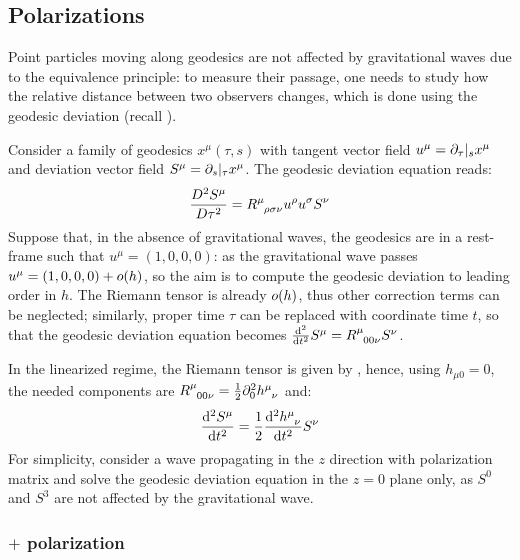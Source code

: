 \subsection{Polarizations}

Point particles moving along geodesics are not affected by gravitational waves due to the equivalence principle: to measure their passage, one needs to study how the relative distance between two observers changes, which is done using the geodesic deviation (recall ).

Consider a family of geodesics $ x^\mu(\tau,s) $ with tangent vector field $ u^\mu = \partial_\tau \vert_s x^\mu $ and deviation vector field $ S^\mu = \partial_s \vert_\tau x^\mu $. The geodesic deviation equation  reads:
\begin{equation*}
  \frac{D^2 S^\mu}{D \tau^2} = \tensor{R}{^\mu_{\rho \sigma \nu}} u^\rho u^\sigma S^\nu
\end{equation*}
Suppose that, in the absence of gravitational waves, the geodesics are in a rest-frame such that $ u^\mu = (1,0,0,0) $: as the gravitational wave passes $ u^\mu = (1,0,0,0) + o(h) $, so the aim is to compute the geodesic deviation to leading order in $ h $. The Riemann tensor is already $ o(h) $, thus other correction terms can be neglected; similarly, proper time $ \tau $ can be replaced with coordinate time $ t $, so that the geodesic deviation equation becomes $ \frac{\dd^2}{\dd t^2} S^\mu = \tensor{R}{^\mu_{00 \nu}} S^\nu $.

In the linearized regime, the Riemann tensor is given by , hence, using $ h_{\mu 0} = 0 $, the needed components are $ \tensor{R}{^\mu_{00 \nu}} = \frac{1}{2} \pa_0^2 \tensor{h}{^\mu_\nu} $ and:
\begin{equation}
  \frac{\dd^2 S^\mu}{\dd t^2} = \frac{1}{2} \frac{\dd^2 \tensor{h}{^\mu_\nu}}{\dd t^2} S^\nu
  \label{eq:weak-geodesic-deviation}
\end{equation}
For simplicity, consider a wave propagating in the $ z $ direction with polarization matrix  and solve the geodesic deviation equation in the $ z = 0 $ plane only, as $ S^0 $ and $ S^3 $ are not affected by the gravitational wave.

\subsubsection{\texorpdfstring{$ + $}{+} polarization}

